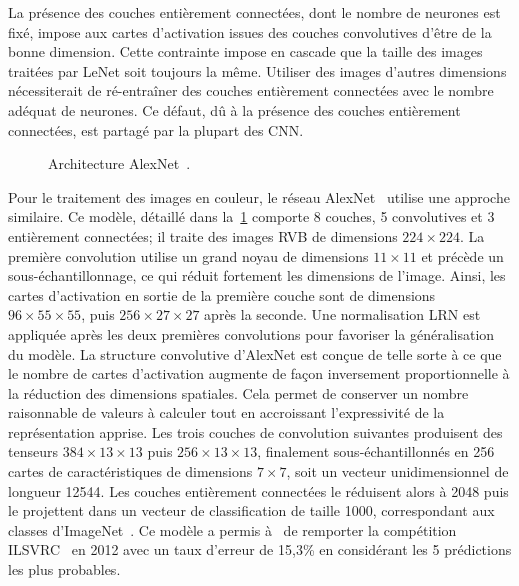 La présence des couches entièrement connectées, dont le nombre de neurones est fixé, impose aux cartes d'activation issues des couches convolutives d'être de la bonne dimension. Cette contrainte impose en cascade que la taille des images traitées par LeNet soit toujours la même. Utiliser des images d'autres dimensions nécessiterait de ré-entraîner des couches entièrement connectées avec le nombre adéquat de neurones. Ce défaut, dû à la présence des couches entièrement connectées, est partagé par la plupart des \gls{CNN}.

\begin{figure}[t]
  \resizebox{\textwidth}{!}{
    
  }
  \caption[Architecture AlexNet]{Architecture AlexNet~\cite{krizhevsky_imagenet_2012}.}
  \label{fig:alexnet}
\end{figure}

Pour le traitement des images en couleur, le réseau \gls{AlexNet}~\cite{krizhevsky_imagenet_2012} utilise une approche similaire. Ce modèle, détaillé dans la~\cref{fig:alexnet} comporte 8 couches, 5 convolutives et 3 entièrement connectées; il traite des images \gls{RVB} de dimensions $224\times224$. La première convolution utilise un grand noyau de dimensions $11\times11$ et précède un sous-échantillonnage, ce qui réduit fortement les dimensions de l'image. Ainsi, les cartes d'activation en sortie de la première couche sont de dimensions $96\times55\times55$, puis $256\times27\times27$ après la seconde. Une normalisation \gls{LRN} est appliquée après les deux premières convolutions pour favoriser la généralisation du modèle. La structure convolutive d'AlexNet est conçue de telle sorte à ce que le nombre de cartes d'activation augmente de façon inversement proportionnelle à la réduction des dimensions spatiales. Cela permet de conserver un nombre raisonnable de valeurs à calculer tout en accroissant l'expressivité de la représentation apprise. Les trois couches de convolution suivantes produisent des tenseurs $384\times13\times13$ puis $256\times13\times13$, finalement sous-échantillonnés en 256 cartes de caractéristiques de dimensions $7\times7$, soit un vecteur unidimensionnel de longueur \num{12544}.
Les couches entièrement connectées le réduisent alors à 2048 puis le projettent dans un vecteur de classification de taille 1000, correspondant aux classes d'ImageNet~\cite{deng_imagenet_2009}. Ce modèle a permis à~\citet{krizhevsky_imagenet_2012} de remporter la compétition \gls{ILSVRC}~\cite{russakovsky_imagenet_2015} en 2012 avec un taux d'erreur de 15,3\% en considérant les 5 prédictions les plus probables.

